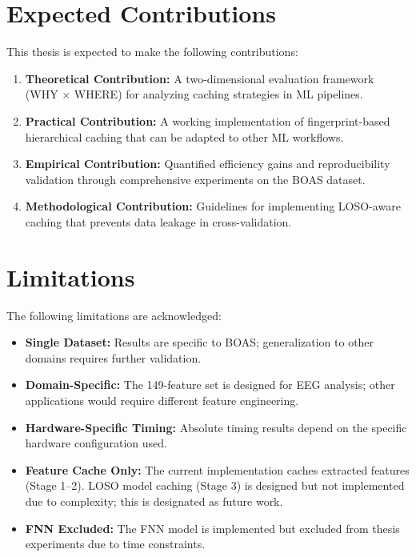 \documentclass{imc-inf} %
\begin{document}
\section{Expected Contributions}

This thesis is expected to make the following contributions:

\begin{enumerate}
\item \textbf{Theoretical Contribution:} A two-dimensional evaluation framework (WHY $\times$ WHERE) for analyzing caching strategies in ML pipelines.

\item \textbf{Practical Contribution:} A working implementation of fingerprint-based hierarchical caching that can be adapted to other ML workflows.

\item \textbf{Empirical Contribution:} Quantified efficiency gains and reproducibility validation through comprehensive experiments on the BOAS dataset.

\item \textbf{Methodological Contribution:} Guidelines for implementing LOSO-aware caching that prevents data leakage in cross-validation.
\end{enumerate}

\section{Limitations}

The following limitations are acknowledged:

\begin{itemize}
\item \textbf{Single Dataset:} Results are specific to BOAS; generalization to other domains requires further validation.
\item \textbf{Domain-Specific:} The 149-feature set is designed for EEG analysis; other applications would require different feature engineering.
\item \textbf{Hardware-Specific Timing:} Absolute timing results depend on the specific hardware configuration used.
\item \textbf{Feature Cache Only:} The current implementation caches extracted features (Stage 1--2). LOSO model caching (Stage 3) is designed but not implemented due to complexity; this is designated as future work.
\item \textbf{FNN Excluded:} The FNN model is implemented but excluded from thesis experiments due to time constraints.
\end{itemize}




\backmatter%


\end{document}
